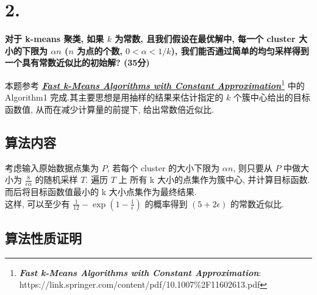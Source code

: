 \documentclass[UTF8]{article}
\newcommand{\jumpLine} {\hspace*{\fill} \par}
\begin{document}
\section*{2.}

\noindent \textbf{对于 k-means 聚类, 如果 $k$ 为常数, 且我们假设在最优解中, 每一个 cluster 大小的下限为 $\alpha n$ ($n$ 为点的个数, $0 < \alpha < 1/k$), 我们能否通过简单的均匀采样得到一个具有常数近似比的初始解? (35分)} \\\jumpLine\noindent
本题参考 \href{https://link.springer.com/content/pdf/10.1007\%2F11602613.pdf}{\textbf{\textit{Fast k-Means Algorithms with Constant Approximation}}}\footnote{\textbf{\textit{Fast k-Means Algorithms with Constant Approximation}}: https://link.springer.com/content/pdf/10.1007\%2F11602613.pdf}
中的 Algorithm1 完成.其主要思想是用抽样的结果来估计指定的 $k$ 个簇中心给出的目标函数值, 从而在减少计算量的前提下, 给出常数倍近似比. 

\subsection*{算法内容}
考虑输入原始数据点集为 $P$, 若每个 cluster 的大小下限为 $\alpha n$, 则只要从 $P$ 中做大小为 $\frac{8}{\epsilon\alpha}$ 的随机采样 $T$. 遍历 $T$ 上 所有 k 大小的点集作为簇中心, 并计算目标函数. 而后将目标函数值最小的 k 大小点集作为最终结果. \\
这样, 可以至少有 $\frac{1}{12} - \exp(1-\frac{1}{\epsilon})$ 的概率得到 $(5+2\epsilon)$ 的常数近似比.

\subsection*{算法性质证明}
\end{document}
